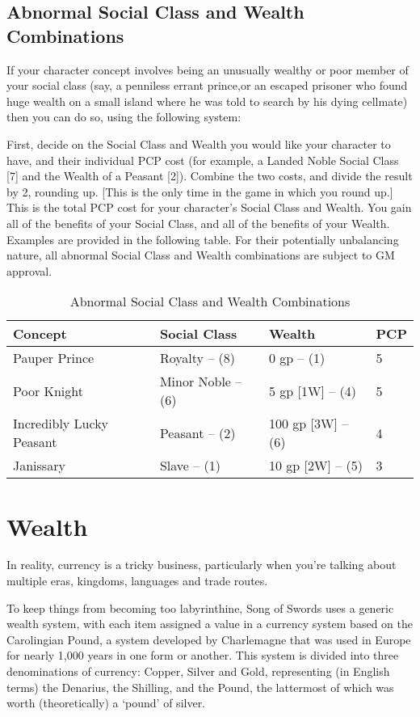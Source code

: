 \documentclass[oneside,11pt,english]{book}
\begin{document}
\subsection{Abnormal Social Class and Wealth Combinations}%
If your character concept involves being an unusually wealthy or poor member of your social class (say, a penniless errant prince,or an escaped prisoner who found huge wealth on a small island where he was told to search by his dying cellmate) then you can do so, using the following system:\par
First, decide on the Social Class and Wealth you would like your character to have, and their individual PCP cost (for example, a Landed Noble Social Class [7] and the Wealth of a Peasant [2]). Combine the two costs, and divide the result by 2, rounding up. [This is the only time in the game in which you round up.] This is the total PCP cost for your character’s Social Class and Wealth. You gain all of the benefits of your Social Class, and all of the benefits of your Wealth. Examples are provided in the following table. For their potentially unbalancing nature, all abnormal Social Class and Wealth combinations are subject to GM approval.

\begin{table}
	\centering
	\caption{Abnormal Social Class and Wealth Combinations}
	\label{tab;Abnormal Class/Wealth Combinations}
	\begin{tabu} spread 0pt {X[l]X[R]X[R]X[-1,c]}
Concept						&Social Class		&Wealth				&PCP \\\toprule
Pauper Prince				&Royalty -- (8)		&0 gp -- (1)		&5\\
Poor Knight					&Minor Noble -- (6)	&5 gp [1W] -- (4)	&5\\
Incredibly Lucky Peasant	&Peasant -- (2)		&100 gp [3W] -- (6)	&4\\
Janissary					&Slave -- (1)		&10 gp [2W] -- (5)	&3\\
	\end{tabu}
\end{table}
\section{Wealth}
In reality, currency is a tricky business, particularly when you're talking about multiple eras, kingdoms, 
languages and trade routes.


To keep things from becoming too labyrinthine, Song of Swords uses a generic wealth system, with each item assigned a value in a currency system based on the Carolingian Pound, a system developed by Charlemagne that was used in Europe for nearly 1,000 years in one form or another. This system is divided into three denominations of currency: Copper, Silver and Gold, representing (in English terms) the Denarius, the Shilling, and the Pound, the lattermost of which was worth (theoretically) a ‘pound’ of silver.
\end{document}
